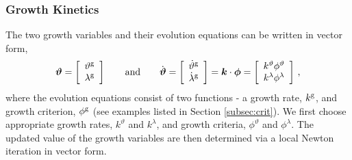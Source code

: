 \documentclass[10pt,letterpaper,oneside]{report}
\newcommand{\ten}[1]{\mbox{\boldmath $#1$}{}}
\newcommand{\scas}[1]{\mbox{{\scriptsize{${\rm{#1}}$}}}{}}
\begin{document}
\begin{itemize}
\subsubsection{Growth Kinetics}
The two growth variables and their evolution equations can be written in vector form, 
\begin{equation}
\ten{\vartheta} = \left[ \begin{array}{c} \vartheta^{\scas{g}} \\ \lambda^{\scas{g}} \end{array} \right] 
\qquad \mbox{and} \qquad
\dot{\ten{\vartheta} } = \left[ \begin{array}{c} \dot{\vartheta}^{\scas{g}} \\ \dot{\lambda}^{\scas{g}} \end{array} \right]  = \ten{k} \cdot \ten{\phi} = \left[ \begin{array}{c} k^{\vartheta} \phi^{\vartheta} \\ k^{\lambda} \phi^{\lambda} \end{array} \right] \, ,
\end{equation}
where the evolution equations consist of two functions - a growth rate, $k^{\scas{g}}$, and growth criterion, $\phi^{\scas{g}}$ (see examples listed in Section \ref{subsec:crit}).  We first choose appropriate growth rates, $k^\vartheta$ and $k^\lambda$, and growth criteria, $\phi^{\vartheta}$ and $\phi^{\lambda}$.  The updated value of the growth variables are then determined via a local Newton iteration in vector form.  


\end{itemize}
\end{document}
